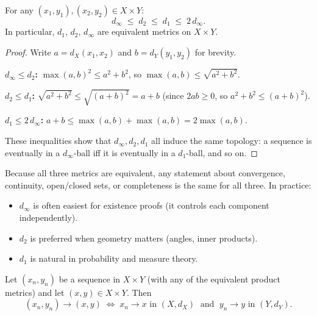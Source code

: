 
\begin{proposition}
\label{prop:product-metrics-equiv}
For any $(x_1,y_1), (x_2,y_2) \in X \times Y$:
\[
d_\infty \;\le\; d_2 \;\le\; d_1 \;\le\; 2\, d_\infty.
\]
In particular, $d_1$, $d_2$, $d_\infty$ are equivalent metrics on $X \times Y$.
\end{proposition}

\begin{proof}
Write $a = d_X(x_1,x_2)$ and $b = d_Y(y_1,y_2)$ for brevity.

\medskip
\noindent\textbf{$d_\infty \le d_2$:} \;
$\max(a,b)^2 \le a^2 + b^2$, so $\max(a,b) \le \sqrt{a^2+b^2}$.

\medskip
\noindent\textbf{$d_2 \le d_1$:} \;
$\sqrt{a^2+b^2} \le \sqrt{(a+b)^2} = a+b$
(since $2ab \ge 0$, so $a^2+b^2 \le (a+b)^2$).

\medskip
\noindent\textbf{$d_1 \le 2\,d_\infty$:} \;
$a + b \le \max(a,b) + \max(a,b) = 2\max(a,b)$.

\medskip
These inequalities show that $d_\infty, d_2, d_1$ all induce the same
topology: a sequence is eventually in a $d_\infty$-ball iff it is
eventually in a $d_1$-ball, and so on.
\end{proof}

\begin{remark*}
Because all three metrics are equivalent, any statement about
convergence, continuity, open/closed sets, or completeness is the
same for all three.
In practice:
\begin{itemize}
  \item $d_\infty$ is often easiest for existence proofs (it controls
        each component independently).
  \item $d_2$ is preferred when geometry matters (angles, inner products).
  \item $d_1$ is natural in probability and measure theory.
\end{itemize}
\end{remark*}


\begin{proposition}
\label{prop:product-convergence}
Let $(x_n, y_n)$ be a sequence in $X \times Y$ (with any of the equivalent
product metrics) and let $(x, y) \in X \times Y$.
Then
\[
(x_n, y_n) \to (x, y)
\;\iff\;
x_n \to x \text{ in } (X, d_X)
\;\text{ and }\;
y_n \to y \text{ in } (Y, d_Y).
\]
\end{proposition}

